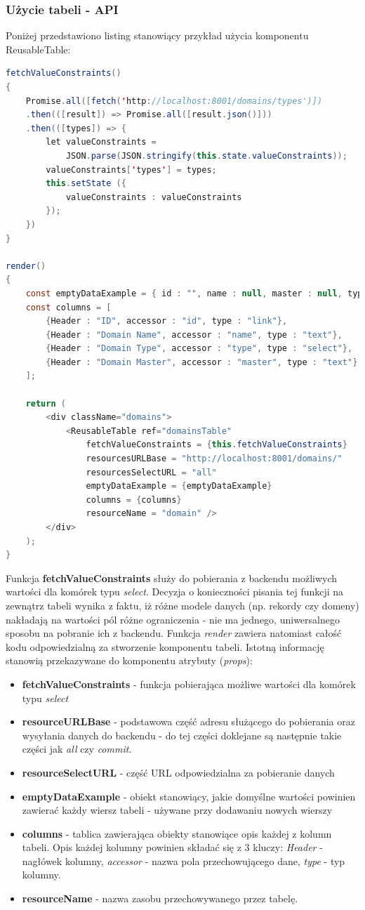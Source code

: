 \documentclass[11pt]{article}
\begin{document}
\subsubsection{Użycie tabeli - API}
Poniżej przedstawiono listing stanowiący przykład użycia komponentu ReusableTable:
\begin{lstlisting}[language=java, tabsize=2]
fetchValueConstraints()
{
	Promise.all([fetch('http://localhost:8001/domains/types')])
	.then(([result]) => Promise.all([result.json()]))
	.then(([types]) => {
		let valueConstraints = 
			JSON.parse(JSON.stringify(this.state.valueConstraints));
		valueConstraints['types'] = types;
		this.setState ({
			valueConstraints : valueConstraints
		});
	})
}

render()
{
	const emptyDataExample = { id : "", name : null, master : null, type : null};
	const columns = [
		{Header : "ID", accessor : "id", type : "link"},
		{Header : "Domain Name", accessor : "name", type : "text"},
		{Header : "Domain Type", accessor : "type", type : "select"},
		{Header : "Domain Master", accessor : "master", type : "text"}
	];

	return (
		<div className="domains">
			<ReusableTable ref="domainsTable"
				fetchValueConstraints = {this.fetchValueConstraints}
				resourcesURLBase = "http://localhost:8001/domains/"
				resourcesSelectURL = "all"
				emptyDataExample = {emptyDataExample}
				columns = {columns}
				resourceName = "domain" />
		</div>
	);
}
\end{lstlisting}
Funkcja \textbf{fetchValueConstraints} służy do pobierania z backendu możliwych wartości dla komórek typu \emph{select}. Decyzja o konieczności pisania tej funkcji na zewnątrz tabeli wynika z faktu, iż różne modele danych (np. rekordy czy domeny) nakładają na wartości pól różne ograniczenia - nie ma jednego, uniwersalnego sposobu na pobranie ich z backendu. Funkcja \emph{render} zawiera natomiast całość kodu odpowiedzialną za stworzenie komponentu tabeli. Istotną informację stanowią przekazywane do komponentu atrybuty (\emph{props}):
\begin{itemize}
\item \textbf{fetchValueConstraints} - funkcja pobierająca możliwe wartości dla komórek typu \emph{select} 
\item \textbf{resourceURLBase} - podstawowa część adresu służącego do pobierania oraz wysyłania danych do backendu - do tej części doklejane są następnie takie części jak \emph{all} czy \emph{commit}.
\item \textbf{resourceSelectURL} - część URL odpowiedzialna za pobieranie danych
\item \textbf{emptyDataExample} - obiekt stanowiący, jakie domyślne wartości powinien zawierać każdy wiersz tabeli - używane przy dodawaniu nowych wierszy
\item \textbf{columns} - tablica zawierająca obiekty stanowiące opis każdej z kolumn tabeli. Opis każdej kolumny powinien składać się z 3 kluczy: \emph{Header} - nagłówek kolumny, \emph{accessor} - nazwa pola przechowującego dane, \emph{type} - typ kolumny.
\item \textbf{resourceName} - nazwa zasobu przechowywanego przez tabelę.
\end{itemize}
\end{document}

